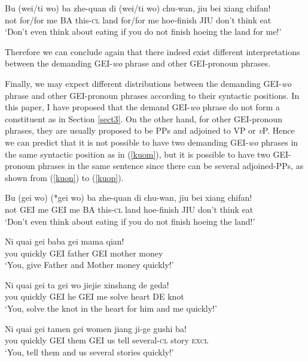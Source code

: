 \documentclass[output=paper,colorlinks,citecolor=brown]{langscibook}
\begin{document}
\ea
\label{kuor}
\gll Bu (wei/ti wo) ba zhe-quan di      (wei/ti wo) chu-wan,   jiu bei 	    xiang   chifan!\\  
     not for/for me BA this-\textsc{cl}  land    for/for me  hoe-finish JIU don't    think   eat\\ 
\glt `Don't even think about eating if you do not finish hoeing the land for me!'
\z

Therefore we can conclude again that there indeed exist different interpretations between the demanding GEI-\textit{wo} phrase and other GEI-pronoun phrases.\par
Finally, we may expect different distributions between the demanding GEI-\textit{wo} phrase and other GEI-pronoun phrases according to their syntactic positions. In this paper, I have proposed that the demand GEI-\textit{wo} phrase do not form a constituent as in Section \ref{sect3}. On the other hand, for other GEI-pronoun phrases, they are usually proposed to be PPs and adjoined to VP or \textit{v}P. Hence we can predict that it is not possible to have two demanding GEI-\textit{wo} phrases in the same syntactic position as in (\ref{kuom}), but it is possible to have two GEI-pronoun phrases in the same sentence since there can be several adjoined-PPs, as shown from (\ref{kuon}) to (\ref{kuop}).

\ea
\label{kuom}
\gll Bu     (gei wo)    (*gei wo)    ba zhe-quan di 	    chu-wan,   jiu bei 	xiang	chifan!\\  
     not     GEI me       GEI me     BA this-\textsc{cl}  land    hoe-finish JIU don't   think    eat   \\ 
\glt `Don't even think about eating if you do not finish hoeing the land!'
\z

\ea
\label{kuon}
\gll Ni     quai    gei baba    gei mama    qian!\\  
     you    quickly GEI father  GEI mother  money\\ 
\glt `You, give Father and Mother money quickly!'
\z

\ea
\label{kuoo}
\gll Ni     quai    gei ta  gei wo  jiejie  xinshang    de  geda!\\  
     you    quickly GEI he  GEI me  solve   heart       DE  knot\\ 
\glt `You, solve the knot in the heart for him and me quickly!'
\z

\ea
\label{kuop}
\gll Ni     quai    gei tamen   gei women   jiang   ji-ge       gushi   ba!\\  
     you    quickly GEI them    GEI us      tell    several-\textsc{cl}  story   \textsc{excl}\\ 
\glt `You, tell them and us several stories quickly!'
\z
\end{document}

